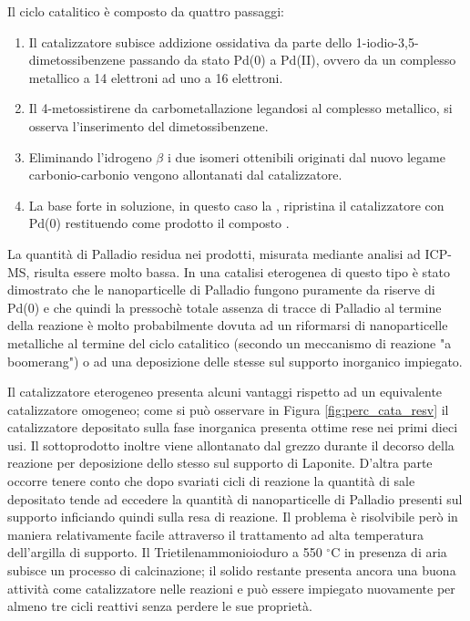 \documentclass[a4paper, 12pt]{article}
\begin{document}
Il ciclo catalitico è composto da quattro passaggi:
\begin{enumerate}
	\item Il catalizzatore  subisce addizione ossidativa da parte dello 1-iodio-3,5-dimetossibenzene passando da stato Pd(0) a Pd(II), ovvero da un complesso metallico a 14 elettroni ad uno a 16 elettroni.
	\item Il 4-metossistirene da carbometallazione legandosi al complesso metallico, si osserva l'inserimento del dimetossibenzene.
	\item Eliminando l'idrogeno $\beta$ i due isomeri ottenibili originati dal nuovo legame carbonio-carbonio vengono allontanati dal catalizzatore.
	\item La base forte in soluzione, in questo caso la , ripristina il catalizzatore con Pd(0) restituendo come prodotto il composto .
\end{enumerate}

La quantità di Palladio residua nei prodotti, misurata mediante analisi ad ICP-MS, risulta essere molto bassa. In una catalisi eterogenea di questo tipo è stato dimostrato che le nanoparticelle di Palladio fungono puramente da riserve di Pd(0) e che quindi la pressochè totale assenza di tracce di Palladio al termine della reazione è molto probabilmente dovuta ad un riformarsi di nanoparticelle metalliche al termine del ciclo catalitico (secondo un meccanismo di reazione "a boomerang") o ad una deposizione delle stesse sul supporto inorganico impiegato.

Il catalizzatore eterogeneo presenta alcuni vantaggi rispetto ad un equivalente catalizzatore omogeneo; come si può osservare in Figura \ref{fig:perc_cata_resv} il catalizzatore depositato sulla fase inorganica presenta ottime rese nei primi dieci usi. Il sottoprodotto  inoltre viene allontanato dal grezzo durante il decorso della reazione per deposizione dello stesso sul supporto di Laponite. D'altra parte occorre tenere conto che dopo svariati cicli di reazione la quantità di sale depositato tende ad eccedere la quantità di nanoparticelle di Palladio presenti sul supporto inficiando quindi sulla resa di reazione. Il problema è risolvibile però in maniera relativamente facile attraverso il trattamento ad alta temperatura dell'argilla di supporto. Il Trietilenammonioioduro a 550 $^\circ$C in presenza di aria subisce un processo di calcinazione; il solido restante presenta ancora una buona attività come catalizzatore nelle reazioni e può essere impiegato nuovamente per almeno tre cicli reattivi senza perdere le sue proprietà.
\end{document}
